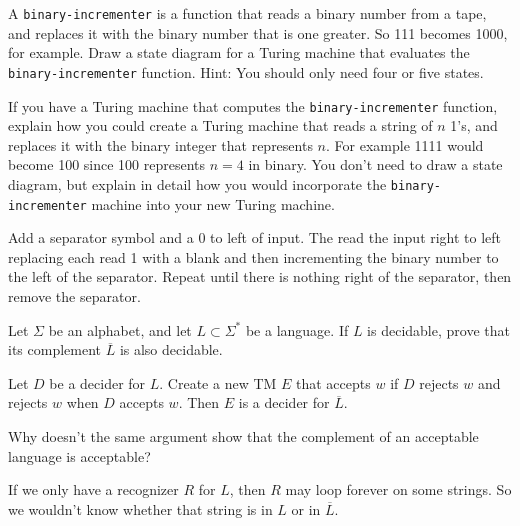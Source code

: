 \documentclass[12pt]{exam}
\begin{document}
\begin{questions}

\question A \verb|binary-incrementer| is a function that reads a binary number from a tape, and replaces it with the binary number that is one greater.  So 111 becomes 1000, for example.  Draw a state diagram for a Turing machine that evaluates the \verb|binary-incrementer| function. Hint: You should only need four or five states. 

\vfill

\newpage
\question If you have a Turing machine that computes the \verb|binary-incrementer| function, explain how you could create a Turing machine that reads a string of $n$ 1's, and replaces it with the binary integer that represents $n$. For example 1111 would become 100 since 100 represents $n=4$ in binary. %
You don't need to draw a state diagram, but explain in detail how you would incorporate the \verb|binary-incrementer| machine into your new Turing machine.
\begin{solution}
Add a separator symbol and a 0 to left of input.  The read the input right to left replacing each read 1 with a blank and then incrementing the binary number to the left of the separator.  Repeat until there is nothing right of the separator, then remove the separator.  
\end{solution}

\vfill

\question Let $\Sigma$ be an alphabet, and let $L \subset \Sigma^*$ be a language.  If $L$ is decidable, prove that its complement $\overline{L}$ is also decidable. 
\begin{solution}
Let $D$ be a decider for $L$.  Create a new TM $E$ that accepts $w$ if $D$ rejects $w$ and rejects $w$ when $D$ accepts $w$. Then $E$ is a decider for $\overline{L}$. 
\end{solution}

\vfill

\question Why doesn't the same argument show that the complement of an acceptable language is acceptable?  
\begin{solution}
If we only have a recognizer $R$ for $L$, then $R$ may loop forever on some strings.  So we wouldn't know whether that string is in $L$ or in $\overline{L}$. 
\end{solution}
\vfill


\end{questions}
\end{document}
